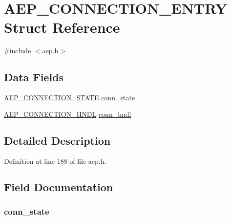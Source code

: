 \hypertarget{struct_a_e_p___c_o_n_n_e_c_t_i_o_n___e_n_t_r_y}{}\section{A\+E\+P\+\_\+\+C\+O\+N\+N\+E\+C\+T\+I\+O\+N\+\_\+\+E\+N\+T\+RY Struct Reference}
\label{struct_a_e_p___c_o_n_n_e_c_t_i_o_n___e_n_t_r_y}


{\ttfamily \#include $<$aep.\+h$>$}

\subsection*{Data Fields}
\begin{DoxyCompactItemize}
\item 
\hyperlink{aep_8h_a41bc5e8468f32c3af48f08b53d0f259c}{A\+E\+P\+\_\+\+C\+O\+N\+N\+E\+C\+T\+I\+O\+N\+\_\+\+S\+T\+A\+TE} \hyperlink{struct_a_e_p___c_o_n_n_e_c_t_i_o_n___e_n_t_r_y_af42fc2df0da202e879ee678c6a0ccfca}{conn\+\_\+state}
\item 
\hyperlink{aep_8h_a457e8c31a8efbe836fb67b997f5eb912}{A\+E\+P\+\_\+\+C\+O\+N\+N\+E\+C\+T\+I\+O\+N\+\_\+\+H\+N\+DL} \hyperlink{struct_a_e_p___c_o_n_n_e_c_t_i_o_n___e_n_t_r_y_ab0a275d4fc3f9f9afd1bb9973ec58783}{conn\+\_\+hndl}
\end{DoxyCompactItemize}


\subsection{Detailed Description}


Definition at line 188 of file aep.\+h.



\subsection{Field Documentation}
\subsubsection[{\texorpdfstring{conn\+\_\+state}{conn_state}}]{ conn\+\_\+state}\hypertarget{struct_a_e_p___c_o_n_n_e_c_t_i_o_n___e_n_t_r_y_af42fc2df0da202e879ee678c6a0ccfca}{}\label{struct_a_e_p___c_o_n_n_e_c_t_i_o_n___e_n_t_r_y_af42fc2df0da202e879ee678c6a0ccfca}


